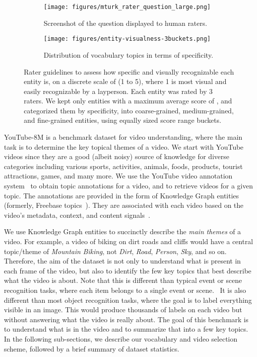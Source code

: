\documentclass{sig-alternate-05-2015}
\begin{document}
\begin{figure*}
  \begin{subfigure}[ht]{0.53\linewidth}
\texttt{[image: figures/mturk\_rater\_question\_large.png]}
    \caption{\label{fig:mturkraters} Screenshot of the question displayed to human raters.}
  \end{subfigure}
  \hspace{0.2in}
  \begin{subfigure}[ht]{0.45\linewidth}
    \centering
    \texttt{[image: figures/entity-visualness-3buckets.png]}
    \caption{\label{fig:visualness} Distribution of vocabulary topics in terms of specificity.}
  \end{subfigure}
  \caption{Rater guidelines to assess how specific and visually recognizable each entity is,
    on a discrete scale of (1 to 5), where 1 is most visual and easily recognizable by a layperson.
    Each entity was rated by 3 raters. We kept only entities with a maximum average
    score of , and categorized them by specificity, into coarse-grained,
    medium-grained, and fine-grained entities, using equally sized score range buckets.}
\end{figure*}


YouTube-8M is a benchmark dataset for video understanding, where the
main task is to determine the key topical themes of a video. We start with
YouTube videos since they are a good (albeit noisy) source of knowledge for
diverse categories including various sports, activities, animals, foods, products,
tourist attractions, games, and many more. We use the YouTube video annotation system~\cite{youtube-legos}
to obtain topic annotations for a video, and to retrieve videos for a given
topic. The annotations are provided in the form of Knowledge Graph entities~\cite{kg} (formerly, Freebase topics~\cite{freebase}).
They are associated with each video based on the video's metadata, context, and content signals~\cite{youtube-legos}.


We use Knowledge Graph entities to succinctly describe the {\em main themes} of
a video. For example, a video of biking on dirt roads
and cliffs would have a central topic/theme of {\it Mountain Biking}, not {\it Dirt},
{\it Road}, {\it Person}, {\it Sky}, and so on. Therefore, the aim of the dataset is not
only to understand what is present in each frame of the video, but also to identify
the few key topics that best describe what the video is about. Note that this is different
than typical event or scene recognition tasks, where each item belongs to a
single event or scene.~\cite{sun,indoorscene}  It is also different than
most object recognition tasks, where the goal is to label everything visible
in an image. This would produce thousands of labels on each video but without
answering what the video is really about. The goal of this benchmark is to
understand what is in the video and to summarize that into a few key topics.
In the following sub-sections, we describe our vocabulary and video
selection scheme, followed by a brief summary of dataset statistics.
\end{document}
